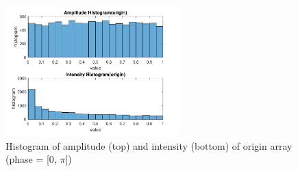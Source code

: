 \documentclass{article}
\begin{document}
\begin{figure}[H]
	\centering
	\includegraphics[width = 0.6\textwidth]{src/pi/hist_origin.pdf}
	\caption{Histogram of amplitude (top) and intensity (bottom) of origin array (phase = [0, $\pi$])}
	\label{fig:hist-origin-pi}
\end{figure}
\end{document}
